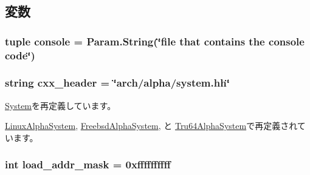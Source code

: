 \subsection{変数}
\hypertarget{classAlphaSystem_1_1AlphaSystem_a9359679c7dbb7d6922387b94caf2c292}{
\subsubsection[{console}]{\setlength{\rightskip}{0pt plus 5cm}tuple {\bf console} = Param.String(\char`\"{}file that contains the {\bf console} code\char`\"{})}}
\label{classAlphaSystem_1_1AlphaSystem_a9359679c7dbb7d6922387b94caf2c292}
\hypertarget{classAlphaSystem_1_1AlphaSystem_a17da7064bc5c518791f0c891eff05fda}{
\subsubsection[{cxx\_\-header}]{\setlength{\rightskip}{0pt plus 5cm}string cxx\_\-header = \char`\"{}arch/alpha/system.hh\char`\"{}}}
\label{classAlphaSystem_1_1AlphaSystem_a17da7064bc5c518791f0c891eff05fda}


\hyperlink{classSystem_1_1System_a17da7064bc5c518791f0c891eff05fda}{System}を再定義しています。

\hyperlink{classAlphaSystem_1_1LinuxAlphaSystem_a17da7064bc5c518791f0c891eff05fda}{LinuxAlphaSystem}, \hyperlink{classAlphaSystem_1_1FreebsdAlphaSystem_a17da7064bc5c518791f0c891eff05fda}{FreebsdAlphaSystem}, と \hyperlink{classAlphaSystem_1_1Tru64AlphaSystem_a17da7064bc5c518791f0c891eff05fda}{Tru64AlphaSystem}で再定義されています。\hypertarget{classAlphaSystem_1_1AlphaSystem_abd9c5cc6b7da624a69344d571bab1038}{
\subsubsection[{load\_\-addr\_\-mask}]{\setlength{\rightskip}{0pt plus 5cm}int load\_\-addr\_\-mask = 0xffffffffff}}
\label{classAlphaSystem_1_1AlphaSystem_abd9c5cc6b7da624a69344d571bab1038}


